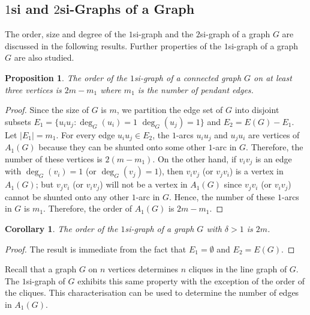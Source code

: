 \documentclass[12pt,a4paper,twoside]{article}
\newtheorem{proposition}[theorem]{Proposition}
\newtheorem{corollary}[theorem]{Corollary}
\theoremstyle{casesty}
\theoremstyle{subcasesty}
\theoremstyle{schemesty}
\begin{document}
\subsection{$1$si and $2$si-Graphs of a Graph}

The order, size and degree of the $1$si-graph and the $2$si-graph of a graph $G$ are discussed in the following results. Further properties of the $1$si-graph of a graph $G$ are also studied.

\begin{proposition} \label{Asnumber1}
	The order of the $1$si-graph of a connected graph $G$ on at least three vertices is $2m-m_{1}$ where $m_{1}$ is the number of pendant edges.
\end{proposition}
\begin{proof}
	Since the size of $G$ is $m$, we partition the edge set of $G$ into disjoint subsets $E_{1}=\{u_{i}u_{j}:\deg_{G}(u_{i})=1$  $\deg_{G}(u_{j})=1\}$ and $E_{2}=E(G)-E_{1}$. Let $|E_{1}|=m_{1}$. For every edge $u_{i}u_{j} \in E_{2}$, the $1$-arcs $u_{i}u_{j}$ and $u_{j}u_{i}$ are vertices of $A_{1}(G)$ because they can be shunted onto some other $1$-arc in $G$. Therefore, the number of these vertices is $2(m-m_{1})$. On the other hand, if $v_{i}v_{j}$ is an edge with $\deg_{G}(v_{i})=1$ (or $\deg_{G}(v_{j})=1$), then $v_{i}v_{j}$ (or $v_{j}v_{i}$) is a vertex in $A_{1}(G)$; but $v_{j}v_{i}$ (or $v_{i}v_{j}$) will not be a vertex in $A_{1}(G)$ since $v_{j}v_{i}$ (or $v_{i}v_{j}$) cannot be shunted onto any other $1$-arc in $G$. Hence, the number of these $1$-arcs in $G$ is $m_{1}$. Therefore, the order of $A_{1}(G)$ is $2m-m_{1}$.
\end{proof}

\begin{corollary} \label{Asnumber1cor}
	The order of the $1$si-graph of a graph $G$ with $\delta > 1$ is $2m$.
\end{corollary}
\begin{proof}
	The result is immediate from the fact that $E_{1}=\emptyset$ and $E_{2}=E(G)$.
\end{proof}

Recall that a graph $G$ on $n$ vertices determines $n$ cliques in the line graph of $G$. The $1$si-graph of $G$ exhibits this same property with the exception of the order of the cliques. This characterisation can be used to determine the number of edges in $A_{1}(G)$. 
\end{document}
